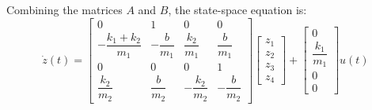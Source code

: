 \documentclass{article}
\begin{document}
Combining the matrices \( A \) and \( B \), the state-space equation is:
\[
\dot{z}(t) = \begin{bmatrix}
0 & 1 & 0 & 0 \\
-\dfrac{k_1 + k_2}{m_1} & -\dfrac{b}{m_1} & \dfrac{k_2}{m_1} & \dfrac{b}{m_1} \\
0 & 0 & 0 & 1 \\
\dfrac{k_2}{m_2} & \dfrac{b}{m_2} & -\dfrac{k_2}{m_2} & -\dfrac{b}{m_2}
\end{bmatrix}
\begin{bmatrix}
z_1 \\
z_2 \\
z_3 \\
z_4
\end{bmatrix}
+
\begin{bmatrix}
0 \\
\dfrac{k_1}{m_1} \\
0 \\
0
\end{bmatrix}
u(t)
\]
\end{document}
